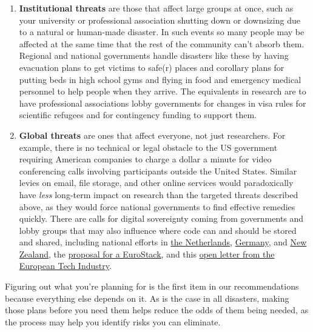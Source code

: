 \documentclass[10pt,letterpaper]{article}
\begin{document}
\begin{enumerate}
\item
  \textbf{Institutional threats} are those that affect large groups at once,
  such as your university or professional association shutting down or downsizing
  due to a natural or human-made disaster.
  In such events so many people may be affected at the same time that
  the rest of the community can't absorb them.
  Regional and national governments handle disasters like these
  by having evacuation plans to get victims to safe(r) places
  and corollary plans for putting beds in high school gyms
  and flying in food and emergency medical personnel to help people when they arrive.
  The equivalents in research are
  to have professional associations lobby governments for changes in visa rules for scientific refugees
  and for contingency funding to support them.
\item
  \textbf{Global threats} are ones that affect everyone,
  not just researchers.
  For example, there is no technical or legal obstacle to the US government
  requiring American companies to charge a dollar a minute for video conferencing calls
  involving participants outside the United States.
  Similar levies on email,
  file storage,
  and other online services would paradoxically have \emph{less} long-term impact on research
  than the targeted threats described above,
  as they would force national governments to find effective remedies quickly.
  There are calls for digital sovereignty coming from governments and lobby groups
  that may also influence where code can and should be stored and shared,
  including national efforts in
  \href{https://www.reuters.com/world/europe/dutch-parliament-calls-end-reliance-us-software-2025-03-18/}{the Netherlands},
  \href{https://www.sovereign.tech/}{Germany},
  and \href{https://zenodo.org/records/15080979}{New Zealand},
  the \href{https://www.politico.eu/article/push-for-eurostack-as-eu-us-tech-tensions-grow/}{proposal for a EuroStack},
  and this \href{https://techcrunch.com/2025/03/16/european-tech-industry-coalition-calls-for-radical-action-on-digital-sovereignty-starting-with-buying-local/}{open letter from the European Tech Industry}.

\end{enumerate}

Figuring out what you're planning for is the first item in our recommendations
because everything else depends on it.
As is the case in all disasters,
making those plans before you need them helps reduce the odds of them being needed,
as the process may help you identify risks you can eliminate.
\end{document}

